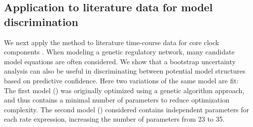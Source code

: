 {\subsection{Application to literature data for model discrimination}
We next apply the method to literature time-course data for core clock components \cite{Lee2001}. 
When modeling a genetic regulatory network, many candidate model equations are often considered. 
We show that a bootstrap uncertainty analysis can also be useful in discriminating between potential model structures based on predictive confidence. 
Here two variations of the same model are fit: The first model () was originally optimized using a genetic algorithm approach, and thus contains a minimal number of parameters to reduce optimization complexity. 
The second model () considered  contains independent parameters for each rate expression, increasing the number of parameters from 23 to 35. 

\begin{model}[h]
  \centering


\end{model}}
